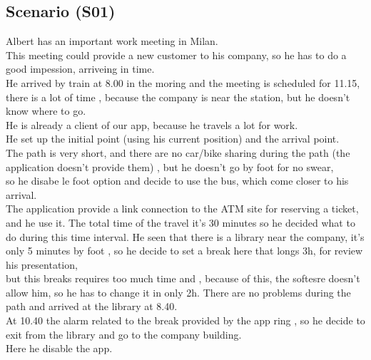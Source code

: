 \documentclass[a4paper]{book}
\begin{document}
\subsection{Scenario (S01) }
Albert has an important work meeting in Milan.\\
This meeting could provide a new customer to his company, so he has to do a good impession, arriveing in time.\\
He arrived by train at 8.00 in the moring and the meeting is scheduled for 11.15, there is a lot of time , because 
the company is near the station, but he doesn't know where to go.\\
He is already a client of our app, because he travels a lot for work.\\
He set up the initial point (using his current position) and the arrival point.\\
The path is very short, and there are no car/bike sharing during the path (the application doesn't provide them) , but he doesn't go by foot for no swear,\\
so he disabe le foot option and decide to use the bus, which come closer to his arrival.\\
The application provide a link connection to the ATM site for reserving a ticket, and he use it.
The total time of the travel it's 30 minutes so he decided what to do during this time interval.
He seen that there is a library near the company, it's only 5 minutes by foot , so he decide to set a break here that longs 3h, for review his presentation,\\
but this breaks requires too much time and , because of this, the softesre doesn't allow him, so he has to change it in only 2h.
There are no problems during the path and arrived at the library at 8.40.\\
At 10.40 the alarm related to the break provided by the app ring , so he decide to exit from the library and go to the company building.\\
Here he disable the app.
\end{document}
